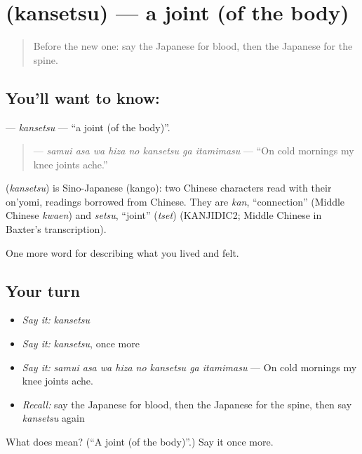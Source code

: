 \section[\texorpdfstring{\ja{かんせつ} (kansetsu)}{かんせつ (kansetsu)}]{ (kansetsu) — a joint (of the body)}

\label{lesson:JA-C442-kansetsu}



\begin{quote}
Before the new one: say the Japanese for blood, then the Japanese for the spine.
\end{quote}

\subsection*{You'll want to know: }
\textbf{} — \emph{kansetsu} — \textquotedblleft{}a joint (of the body)\textquotedblright{}.

\begin{quote}
\textbf{    } — \emph{samui asa wa hiza no kansetsu ga itamimasu} — \textquotedblleft{}On cold mornings my knee joints ache.\textquotedblright{}
\end{quote}

\begin{cousinweb}
\textbf{} (\emph{kansetsu}) is Sino-Japanese (kango): two Chinese characters read with their on'yomi, readings borrowed from Chinese. They are \emph{kan}, \textquotedblleft{}connection\textquotedblright{} (Middle Chinese \emph{kwaen}) and \emph{setsu}, \textquotedblleft{}joint\textquotedblright{} (\emph{tset}) (KANJIDIC2; Middle Chinese in Baxter's transcription).
\end{cousinweb}

\begin{grammarlens}[title={What you've built}]
One more word for describing what you lived and felt.
\end{grammarlens}

\subsection*{Your turn}
\begin{itemize}
\raggedright
  \item \emph{Say it:} \emph{kansetsu}
  \item \emph{Say it:} \emph{kansetsu}, once more
  \item \emph{Say it:} \emph{samui asa wa hiza no kansetsu ga itamimasu} — On cold mornings my knee joints ache.
  \item \emph{Recall:} say the Japanese for blood, then the Japanese for the spine, then say \emph{kansetsu} again
\end{itemize}

\begin{tcolorbox}[breakable,colback=teal!4,colframe=teal!35!black,title={Before you move on}]
What does  mean? (\textquotedblleft{}A joint (of the body)\textquotedblright{}.) Say it once more.
\end{tcolorbox}
